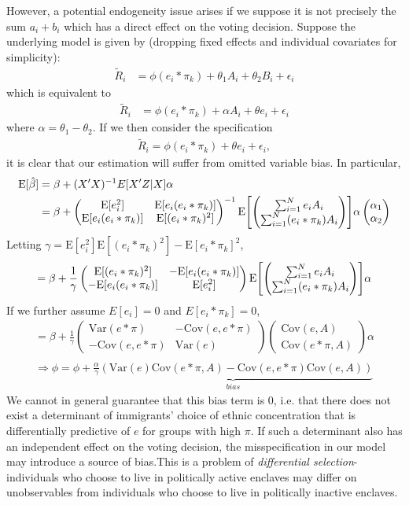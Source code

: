 \documentclass[11pt, oneside]{article}   	%
\newcommand{\eqs}[1]{\begin{align*}#1\end{align*}}
\newcommand{\Var}{\mathrm{Var}}
\newcommand{\Cov}{\mathrm{Cov}}
\newcommand{\E}{\mathrm{E}}
\begin{document}
However, a potential endogeneity issue arises if we suppose it is not precisely the sum $a_i+b_i$ which has a direct effect on the voting decision. Suppose the underlying model is given by (dropping fixed effects and individual covariates for simplicity):
\eqs{
	\tilde R_i &= \phi (e_i * \pi_k) +  \theta_1 A_i +\theta_2 B_i + \epsilon_i
}
which is equivalent to
\eqs{
	\tilde R_i &= \phi (e_i * \pi_k) +  \alpha A_i +\theta e_i + \epsilon_i
}
where $\alpha = \theta_1-\theta_2$. If we then consider the specification
\eqs{
	\tilde R_i = \phi (e_i * \pi_k) + \theta e_i  + \epsilon_i,
}
it is clear that our estimation will suffer from omitted variable bias. In particular,
\eqs{
	\E[\hat \beta] &= \beta + (X'X)^{-1}E[X'Z|X]\alpha \\
	&= \beta + \begin{pmatrix} \E[e_i^2] &\E[e_i(e_i*\pi_k)] \\ \E[e_i(e_i*\pi_k)] &\E[(e_i*\pi_k)^2] \end{pmatrix}^{-1}
	\E\qty[\begin{pmatrix} \sum_{i=1}^N e_{i}A_i \\ \sum_{i=1}^N(e_i*\pi_k)A_i \end{pmatrix}]\alpha \begin{pmatrix}\alpha_1 \\ \alpha_2 \end{pmatrix}
}
Letting $\gamma = \E[e_i^2]\E[(e_i*\pi_k)^2]-\E[e_i*\pi_k]^2$,
\eqs{
	=\beta + \frac{1}{\gamma}\begin{pmatrix}  \E[(e_i*\pi_k)^2]& -\E[e_i(e_i*\pi_k)] \\ -\E[e_i(e_i*\pi_k)] &\E[e_i^2] \end{pmatrix}\E\qty[\begin{pmatrix} \sum_{i=1}^N e_{i}A_i \\ \sum_{i=1}^N(e_i*\pi_k)A_i \end{pmatrix}]\alpha
}
If we further assume $E[e_i] = 0$ and $E[e_i*\pi_k] = 0$,
\eqs{
	=\beta + \frac{1}{\gamma}\begin{pmatrix}  \Var(e*\pi)& -\Cov(e,e*\pi) \\ -\Cov(e,e*\pi) &\Var(e) \end{pmatrix}\begin{pmatrix} \Cov(e,A) \\ \Cov(e*\pi,A) \end{pmatrix}\alpha \\
	\Rightarrow \hat\phi = \phi +\underbrace{\frac{\alpha}{\gamma}(\Var(e)\Cov(e*\pi,A)-\Cov(e,e*\pi)\Cov(e,A))}_{bias}
}
We cannot in general guarantee that this bias term is 0, i.e. that there does not exist a determinant of immigrants' choice of ethnic concentration that is differentially predictive of $e$ for groups with high $\pi$. If such a determinant also has an independent effect on the voting decision, the misspecification in our model may introduce a source of bias.This is a problem of \emph{differential selection}-individuals who choose to live in politically active enclaves may differ on unobservables from individuals who choose to live in politically inactive enclaves. 
\end{document}
